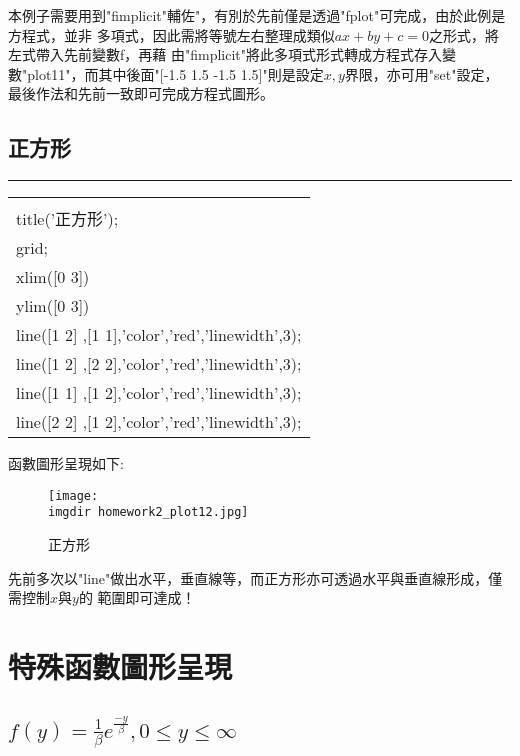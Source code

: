 		本例子需要用到"fimplicit"輔佐"，有別於先前僅是透過"fplot"可完成，由於此例是方程式，並非			多項式，因此需將等號左右整理成類似$ax+by+c=0$之形式，將左式帶入先前變數f，再藉					由"fimplicit"將此多項式形式轉成方程式存入變數"plot11"，而其中後面"[-1.5 1.5 -1.5 				1.5]"則是設定$x,y$界限，亦可用"set"設定，最後作法和先前一致即可完成方程式圖形。
		\newpage
		\subsection{正方形}%
		\rule{\textwidth}{0.2pt}
		\begin{center}\colorbox{slight}{
				\begin{tabular}{p{}}
					\MJHmarker{\textbf{MATLAB語法 :}}\\					
					title('正方形');\\
					grid;\\
					xlim([0 3])\\
					ylim([0 3])\\
					line([1 2] ,[1 1],'color','red','linewidth',3);\\
					line([1 2] ,[2 2],'color','red','linewidth',3);\\
					line([1 1] ,[1 2],'color','red','linewidth',3);\\
					line([2 2] ,[1 2],'color','red','linewidth',3);\\
				\end{tabular}
			}
			\end{center}	
				
		函數圖形呈現如下:
		\begin{figure}[H]	
		 	 \centering	 			 	 
   			 \texttt{[image: \\imgdir homework2\_plot12.jpg]} 
   			 \caption{正方形}   		
   			 \label{plot12}   			 		 
		\end{figure}
		
		先前多次以"line"做出水平，垂直線等，而正方形亦可透過水平與垂直線形成，僅需控制$x$與$y$的			範圍即可達成！
	\section{特殊函數圖形呈現}
		\subsection{$f(y)=\frac{1}{\beta}e^{\frac{-y}{\beta}},0\leq y \leq \infty$}%
		
